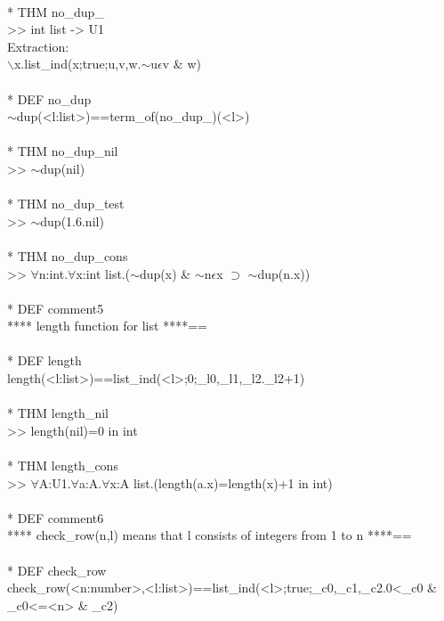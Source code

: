 \N{} \\{}
\N{}* THM no\_dup\_ \\{}
\N{}      >> int list -> U1 \\{}
\N{}      Extraction: \\{}
\N{}      \(\backslash{}\)x.list\_ind(x;true;u,v,w.\(\sim{}\)u\(\epsilon{}\)v \& w) \\{}
\N{} \\{}
\N{}* DEF no\_dup \\{}
\N{}      \(\sim{}\)dup(<l:list>)==term\_of(no\_dup\_)(<l>) \\{}
\N{} \\{}
\N{}* THM no\_dup\_nil \\{}
\N{}      >> \(\sim{}\)dup(nil) \\{}
\N{} \\{}
\N{}* THM no\_dup\_test \\{}
\N{}      >> \(\sim{}\)dup(1.6.nil) \\{}
\N{} \\{}
\N{}* THM no\_dup\_cons \\{}
\N{}      >> \(\forall{}\)n:int.\(\forall{}\)x:int list.(\(\sim{}\)dup(x) \& \(\sim{}\)n\(\epsilon{}\)x \(\supset{}\) \(\sim{}\)dup(n.x)) \\{}
\N{} \\{}
\N{}* DEF comment5 \\{}
\N{}      **** length function for list ****== \\{}
\N{} \\{}
\N{}* DEF length \\{}
\N{}      length(<l:list>)==list\_ind(<l>;0;\_l0,\_l1,\_l2.\_l2+1) \\{}
\N{} \\{}
\N{}* THM length\_nil \\{}
\N{}      >> length(nil)=0 in int \\{}
\N{} \\{}
\N{}* THM length\_cons \\{}
\N{}      >> \(\forall{}\)A:U1.\(\forall{}\)a:A.\(\forall{}\)x:A list.(length(a.x)=length(x)+1 in int) \\{}
\N{} \\{}
\N{}* DEF comment6 \\{}
\N{}      **** check\_row(n,l) means that l consists of integers from 1 to n ****== \\{}
\N{} \\{}
\N{}* DEF check\_row \\{}
\N{}      check\_row(<n:number>,<l:list>)==list\_ind(<l>;true;\_c0,\_c1,\_c2.0<\_c0 \& \_c0<=<n> \& \_c2) \\{}
